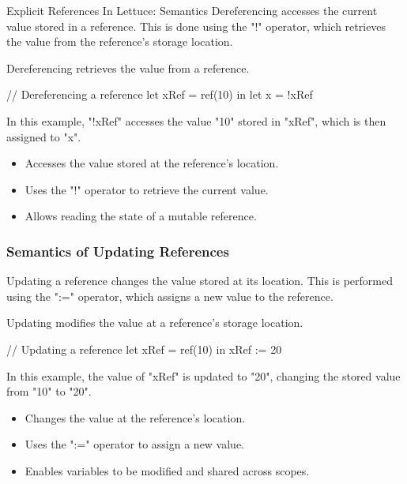 \begin{notes}{Explicit References In Lettuce: Semantics}
    Dereferencing accesses the current value stored in a reference. This is done using the "!" operator, which retrieves the value from the reference's storage location.
    
    \begin{highlight}
    
        Dereferencing retrieves the value from a reference.
    
    \begin{code}[Lettuce]
    // Dereferencing a reference
    let xRef = ref(10) in
    let x = !xRef
    \end{code}
    
        In this example, "!xRef" accesses the value "10" stored in "xRef", which is then assigned to "x".
    
        \begin{itemize}
            \item Accesses the value stored at the reference's location.
            \item Uses the "!" operator to retrieve the current value.
            \item Allows reading the state of a mutable reference.
        \end{itemize}
    
    \end{highlight}
    
    \subsubsection*{Semantics of Updating References}
    
    Updating a reference changes the value stored at its location. This is performed using the ":=" operator, which assigns a new value to the reference.
    
    \begin{highlight}
    
        Updating modifies the value at a reference's storage location.
    
    \begin{code}[Lettuce]
    // Updating a reference
    let xRef = ref(10) in
    xRef := 20
    \end{code}
    
        In this example, the value of "xRef" is updated to "20", changing the stored value from "10" to "20".
    
        \begin{itemize}
            \item Changes the value at the reference's location.
            \item Uses the ":=" operator to assign a new value.
            \item Enables variables to be modified and shared across scopes.
        \end{itemize}
    

\end{highlight}
\end{notes}
